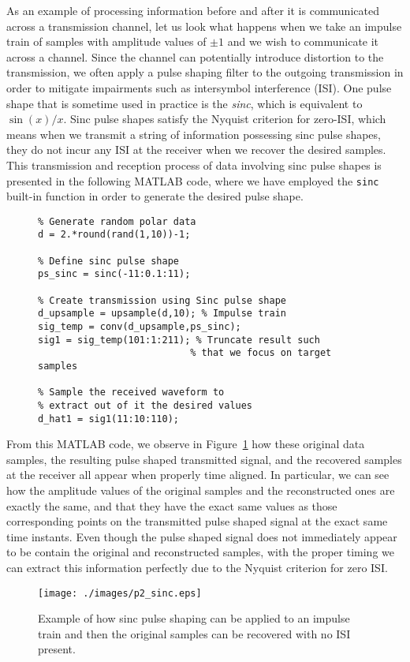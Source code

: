 \documentclass[letterpaper,12pt]{article}
\begin{document}
As an example of processing information before and after it is communicated across a transmission channel, let us look what happens when we take an impulse train of samples with amplitude values of $\pm{1}$ and we wish to communicate it
across a channel.  Since the channel can potentially introduce distortion to the transmission, we often apply a pulse shaping filter to the outgoing transmission in order to mitigate impairments such as intersymbol interference (ISI).
One pulse shape that is sometime used in practice is the \textit{sinc}, which is equivalent to $\sin(x)/x$.  Sinc pulse shapes satisfy the Nyquist criterion for zero-ISI, which means when we transmit a string of information 
possessing sinc pulse shapes, they do not incur any ISI at the receiver when we recover the desired samples.  This transmission and reception process of data involving sinc pulse shapes is presented in the following MATLAB
code, where we have employed the \texttt{sinc} built-in function in order to generate the desired pulse shape.
\begin{figure}[h]
\centering
\begin{minipage}[framed]{0.9\textwidth}
\begin{lstlisting}
% Generate random polar data
d = 2.*round(rand(1,10))-1;

% Define sinc pulse shape
ps_sinc = sinc(-11:0.1:11);

% Create transmission using Sinc pulse shape
d_upsample = upsample(d,10); % Impulse train
sig_temp = conv(d_upsample,ps_sinc);
sig1 = sig_temp(101:1:211); % Truncate result such 
                           % that we focus on target samples

% Sample the received waveform to 
% extract out of it the desired values
d_hat1 = sig1(11:10:110);
\end{lstlisting}
\end{minipage}
\captionsetup{labelformat=empty}
\end{figure}

From this MATLAB code, we observe in Figure~\ref{f:p2_sinc} how these original data samples, the resulting pulse shaped transmitted signal, and the recovered samples at the receiver all appear when properly time aligned.  In particular,
we can see how the amplitude values of the original samples and the reconstructed ones are exactly the same, and that they have the exact same values as those corresponding points on the transmitted pulse shaped 
signal at the exact same time instants.  Even though the pulse shaped signal does not immediately appear to be contain the original and reconstructed samples, with the proper timing we can extract this information perfectly due to the
Nyquist criterion for zero ISI.
\begin{figure}[h]
 \centering
 \texttt{[image: ./images/p2\_sinc.eps]}
 \caption{Example of how sinc pulse shaping can be applied to an impulse train and then the original samples can be recovered with no ISI present.}\label{f:p2_sinc}
\end{figure}
\end{document}
